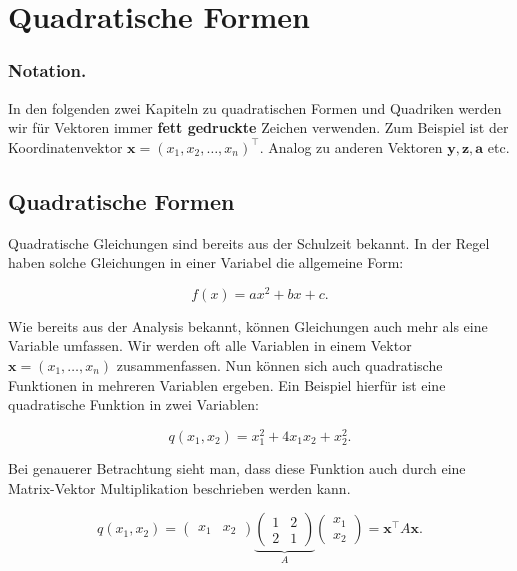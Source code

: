 \setcounter{section}{6}
\section{Quadratische Formen}

\subsubsection{Notation.}

In den folgenden zwei Kapiteln zu quadratischen Formen und Quadriken werden wir für Vektoren immer \textbf{fett gedruckte} Zeichen verwenden. Zum Beispiel ist der Koordinatenvektor \( \mathbf{x} = (x_1, x_2, \dots, x_n)^\top \). Analog zu anderen Vektoren \( \mathbf{y, z, a} \) etc. 

\subsection{Quadratische Formen}

Quadratische Gleichungen sind bereits aus der Schulzeit bekannt. In der Regel haben solche Gleichungen in einer Variabel die allgemeine Form:

\begin{equation*}
    f(x) = ax^2 + bx + c.
\end{equation*}

Wie bereits aus der Analysis bekannt, können Gleichungen auch mehr als eine Variable umfassen. Wir werden oft alle Variablen in einem Vektor \( \mathbf{x} = (x_1, \dots, x_n) \) zusammenfassen. Nun können sich auch quadratische Funktionen in mehreren Variablen ergeben. Ein Beispiel hierfür ist eine quadratische Funktion in zwei Variablen:

\begin{equation*}
    q(x_1,x_2) = x_1^2 + 4x_1x_2 + x_2^2.
\end{equation*}

Bei genauerer Betrachtung sieht man, dass diese Funktion auch durch eine Matrix-Vektor Multiplikation beschrieben werden kann. 

\begin{equation*}
    q(x_1, x_2) = \begin{pmatrix} x_1 & x_2 \end{pmatrix} \underbrace{\begin{pmatrix} 1 & 2 \\ 2 & 1 \end{pmatrix}}_{A} \begin{pmatrix} x_1 \\ x_2 \end{pmatrix} = \mathbf{x}^\top A \mathbf{x}.
\end{equation*}

